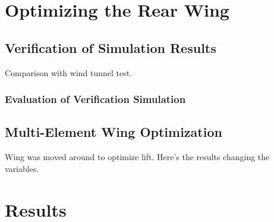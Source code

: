 \section{Optimizing the Rear Wing}


  \subsection{Verification of Simulation Results}
  \label{sec:simulationcomparison}

  Comparison with wind tunnel test.

  \subsubsection{Evaluation of Verification Simulation}

  \subsection{Multi-Element Wing Optimization}
  Wing was moved around to optimize lift. Here's the results changing the variables.

\section{Results}
